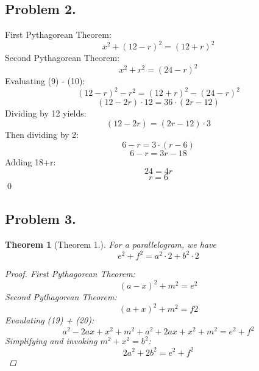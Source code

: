 \documentclass{article}
\newtheorem{theorem}{Theorem}
\begin{document}
\subsection{Problem 2.}

First Pythagorean Theorem:
\begin{equation}
    x^2 + (12-r)^2 = (12+r)^2
\end{equation}
Second Pythagorean Theorem:
\begin{equation}
    x^2 + r^2 = (24-r)^2
\end{equation}
Evaluating (9) - (10):
\begin{equation}
    (12-r)^2 - r^2 = (12+r)^2 - (24-r)^2
\end{equation}
\begin{equation}
    (12-2r) \cdot 12 = 36 \cdot (2r - 12)
\end{equation}
Dividing by 12 yields:
\begin{equation}
    (12-2r) = (2r - 12) \cdot 3
\end{equation}
Then dividing by 2:
\begin{equation}
    6-r = 3 \cdot (r-6)
\end{equation}
\begin{equation}
    6-r = 3r - 18
\end{equation}
Adding 18+r:
\begin{equation}
    24 = 4r
\end{equation}
\begin{equation}
    r = 6
\end{equation}
\qed

\subsection{Problem 3.}
\begin{theorem}[Theorem 1.]
For a parallelogram, we have
\begin{equation}
    e^2 + f^2 = a^2 \cdot2 + b^2 \cdot2
\end{equation}
\begin{proof}
First Pythagorean Theorem:
\begin{equation}
    (a-x)^2 + m^2 = e^2
\end{equation}
Second Pythagorean Theorem:
\begin{equation}
    (a+x)^2 + m^2 = f2
\end{equation}
Evaulating (19) + (20):
\begin{equation}
    a^2 - 2ax + x^2 + m^2 + a^2 + 2ax + x^2 + m^2 = e^2 + f^2
\end{equation}
Simplifying and invoking $m^2 + x^2 = b^2$:
\begin{equation}
    2a^2 + 2b^2 = e^2 + f^2
\end{equation}
\end{proof}

\end{theorem}
\end{document}
